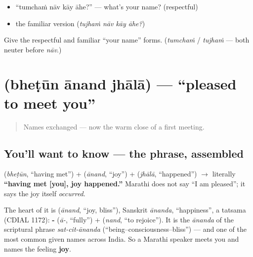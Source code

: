 \begin{itemize}
\raggedright
  \item \textquotedblleft{}tumchaṁ nāv kāy āhe?\textquotedblright{} — what's your name? (respectful)
  \item the familiar version (\emph{tujhaṁ nāv kāy āhe?})
\end{itemize}

\begin{tcolorbox}[breakable,colback=teal!4,colframe=teal!35!black,title={Before you move on}]
Give the respectful and familiar \textquotedblleft{}your name\textquotedblright{} forms. (\emph{tumchaṁ} / \emph{tujhaṁ} — both neuter before \emph{nāv}.)
\end{tcolorbox}
\section[\texorpdfstring{\mr{भेटून} \mr{आनंद} \mr{झाला} (bheṭūn ānand jhālā)}{भेटून आनंद झाला (bheṭūn ānand jhālā)}]{   (bheṭūn ānand jhālā) — \textquotedblleft{}pleased to meet you\textquotedblright{}}

\label{lesson:MR-C02-anand}



\begin{quote}
Names exchanged — now the warm close of a first meeting.
\end{quote}

\subsection*{You'll want to know — the phrase, assembled}
\textbf{} (\emph{bheṭūn}, \textquotedblleft{}having met\textquotedblright{}) + \textbf{} (\emph{ānand}, \textquotedblleft{}joy\textquotedblright{}) + \textbf{} (\emph{jhālā}, \textquotedblleft{}happened\textquotedblright{}) $\to$ literally \textbf{\textquotedblleft{}having met {[}you{]}, joy happened.\textquotedblright{}} Marathi does not say \textquotedblleft{}I am pleased\textquotedblright{}; it says the joy itself \emph{occurred}.

\begin{cousinweb}
The heart of it is \textbf{} (\emph{ānand}, \textquotedblleft{}joy, bliss\textquotedblright{}), Sanskrit \emph{ānanda}, \textquotedblleft{}happiness\textquotedblright{}, a tatsama (CDIAL 1172): \textbf{-} (\emph{ā-}, \textquotedblleft{}fully\textquotedblright{}) + \textbf{} (\emph{nand}, \textquotedblleft{}to rejoice\textquotedblright{}). It is the \emph{ānanda} of the scriptural phrase \emph{sat-cit-ānanda} (\textquotedblleft{}being–consciousness–bliss\textquotedblright{}) — and one of the most common given names across India. So a Marathi speaker meets you and names the feeling \textbf{joy}.
\end{cousinweb}

